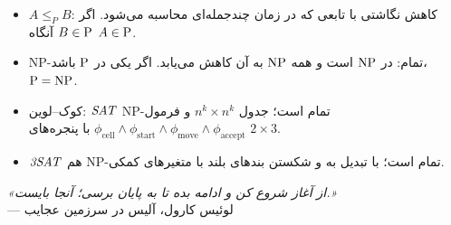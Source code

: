 \begin{summary}
\begin{itemize}
\item $A\le_PB$: کاهش نگاشتی با تابعی که در زمان چندجمله‌ای محاسبه می‌شود. اگر $B\in\mathrm{P}$ آنگاه $A\in\mathrm{P}$.
\item NP-تمام: در $\mathrm{NP}$ است و همه $\mathrm{NP}$ به آن کاهش می‌یابد. اگر یکی در $\mathrm{P}$ باشد، $\mathrm{P}=\mathrm{NP}$.
\item کوک–لوین: $\mathit{SAT}$ NP-تمام است؛ جدول $n^k\times n^k$ و فرمول $\phi_{\mathrm{cell}}\wedge\phi_{\mathrm{start}}\wedge\phi_{\mathrm{move}}\wedge\phi_{\mathrm{accept}}$ با پنجره‌های $2\times3$.
\item $\mathit{3SAT}$ هم NP-تمام است؛ با تبدیل به  و شکستن بندهای بلند با متغیرهای کمکی.
\end{itemize}
\end{summary}

\vspace{1cm}
\begin{center}
\textit{«از آغاز شروع کن و ادامه بده تا به پایان برسی؛ آنجا بایست.»}\\[2pt]
{\small — لوئیس کارول، آلیس در سرزمین عجایب}
\end{center}
